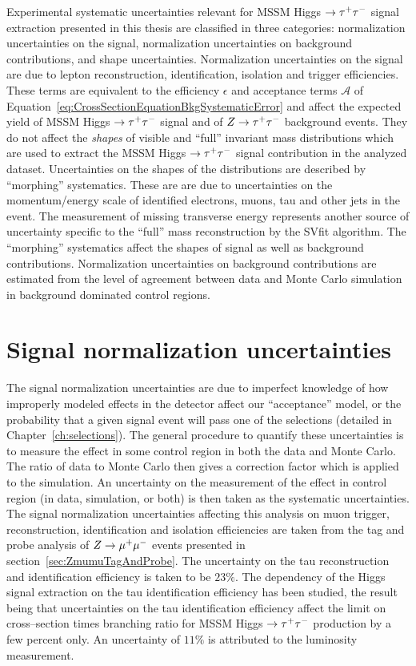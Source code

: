 Experimental systematic uncertainties relevant for MSSM Higgs $\to \tau^+\tau^-$ signal
extraction presented in this thesis are classified in three categories:
normalization uncertainties on the signal, normalization uncertainties on
background contributions, and shape uncertainties.  Normalization uncertainties
on the signal are due to lepton reconstruction, identification, isolation and
trigger efficiencies.  These terms are equivalent to the efficiency $\epsilon$
and acceptance terms $\mathcal{A}$ of
Equation~\ref{eq:CrossSectionEquationBkgSystematicError} and affect the expected
yield of MSSM Higgs $\to \tau^+\tau^-$ signal and of $Z \to \tau^+\tau^-$ background events.  They
do not affect the \emph{shapes} of visible and ``full'' invariant mass
distributions which are used to extract the MSSM Higgs $\to \tau^+\tau^-$ signal
contribution in the analyzed dataset.  Uncertainties on the shapes of the
distributions are described by ``morphing'' systematics.  These are are due to
uncertainties on the momentum/energy scale of identified electrons, muons, tau
and other jets in the event.  The measurement of missing transverse energy
represents another source of uncertainty specific to the ``full'' mass
reconstruction by the SVfit algorithm.  The ``morphing'' systematics affect the
shapes of signal as well as background contributions.  Normalization
uncertainties on background contributions are estimated from the level of
agreement between data and Monte Carlo simulation in background dominated
control regions.

\section{Signal normalization uncertainties}

The signal normalization uncertainties are due to imperfect knowledge of how
improperly modeled effects in the detector affect our ``acceptance'' model, or
the probability that a given signal event will pass one of the selections
(detailed in Chapter~\ref{ch:selections}).  The general procedure to quantify
these uncertainties is to measure the effect in some control region in both the
data and Monte Carlo.  The ratio of data to Monte Carlo then gives a correction
factor which is applied to the simulation.  An uncertainty on the measurement of
the effect in control region (in data, simulation, or both) is then taken as the
systematic uncertainties.  The signal normalization uncertainties affecting this
analysis on muon trigger, reconstruction, identification and isolation
efficiencies are taken from the tag and probe analysis of $Z \to \mu^+\mu^-$ events
presented in section~\ref{sec:ZmumuTagAndProbe}.  The uncertainty on the tau
reconstruction and identification efficiency is taken to be $23\%$.  The
dependency of the Higgs signal extraction on the tau identification efficiency
has been studied, the result being that uncertainties on the tau identification
efficiency affect the limit on cross--section times branching ratio for MSSM
Higgs $\to \tau^+\tau^-$ production by a few percent only.  An uncertainty of $11\%$ is
attributed to the luminosity measurement.


